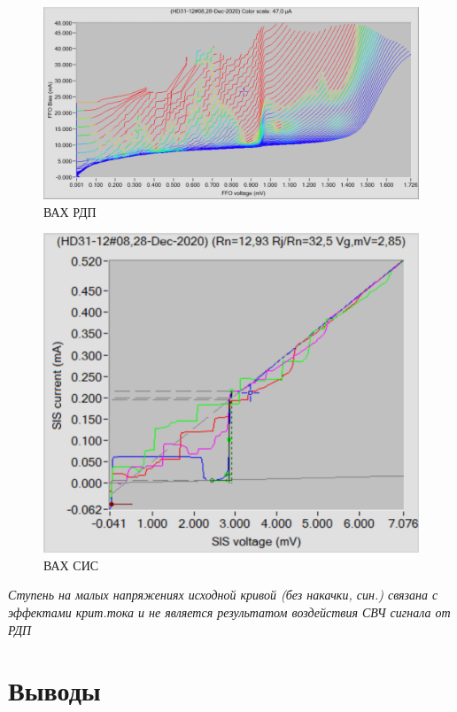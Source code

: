 \documentclass[12pt,a4paper]{article}
\begin{document}
\begin{figure}[H]
    \centering
    \includegraphics[scale = 0.4]{FFO-exp.png}
    \caption{ВАХ РДП}
    \label{FFO-exp}
\end{figure}

\begin{figure}[H]
    \centering
    \includegraphics[scale = 0.5]{sis-exp.png}
    \caption{ВАХ СИС}
    \label{sis-exp}
\end{figure}

\begin{center}
    \textit{Ступень на малых напряжениях исходной кривой (без накачки, син.) связана с эффектами крит.тока и не является результатом воздействия СВЧ сигнала от РДП}
\end{center}

\newpage

\section{Выводы}
\end{document}
